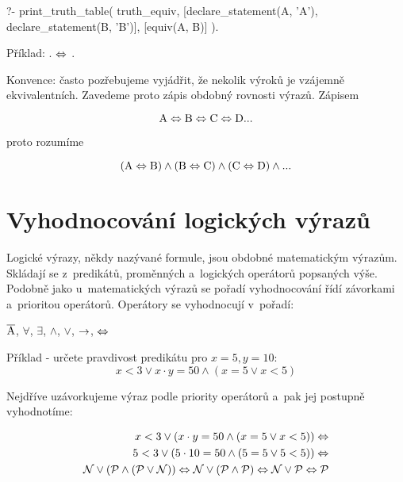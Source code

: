\begin{prolog}
?- print_truth_table(
	truth_equiv,
	[declare_statement(A, 'A'), declare_statement(B, 'B')],
	[equiv(A, B)]
).
\end{prolog}

Příklad: .  \(\Leftrightarrow\) .

Konvence: často pozřebujeme vyjádřit, že nekolik výroků je vzájemně ekvivalentních. Zavedeme proto zápis obdobný rovnosti výrazů. Zápisem

\begin{equation}
\mathrm{A} \Leftrightarrow \mathrm{B} \Leftrightarrow \mathrm{C} \Leftrightarrow \mathrm{D} ... 
\end{equation}

proto rozumíme

\begin{equation}
(\mathrm{A} \Leftrightarrow \mathrm{B}) \land (\mathrm{B} \Leftrightarrow \mathrm{C}) \land (\mathrm{C} \Leftrightarrow \mathrm{D}) \land ... 
\end{equation}

\section{Vyhodnocování logických výrazů}

Logické výrazy, někdy nazývané formule, jsou obdobné matematickým výrazům. Skládají se z~predikátů, proměnných a~logických operátorů popsaných výše. Podobně jako u~matematických výrazů se pořadí vyhodnocování řídí závorkami a~prioritou operátorů. Operátory se vyhodnocují v~pořadí:

\(\overline{\mathrm{A}}\), \(\forall\), \(\exists\), \(\land\), \(\lor\), \(\rightarrow\), \(\Leftrightarrow\)

Příklad - určete pravdivost predikátu pro \(x = 5, y = 10\):
\begin{equation}
x < 3 \lor x \cdot y = 50 \land (x = 5 \lor x < 5)
\end{equation}

Nejdříve uzávorkujeme výraz podle priority operátorů a~pak jej postupně vyhodnotíme:

\begin{equation}
\begin{split}
x < 3 \lor (x \cdot y = 50 \land (x = 5 \lor x < 5)) \Leftrightarrow \\
5 < 3 \lor (5 \cdot 10 = 50 \land (5 = 5 \lor 5 < 5)) \Leftrightarrow \\
\mathcal{N} \lor (\mathcal{P} \land (\mathcal{P} \lor \mathcal{N})) \Leftrightarrow \mathcal{N} \lor (\mathcal{P} \land \mathcal{P}) \Leftrightarrow \mathcal{N} \lor \mathcal{P} \Leftrightarrow \mathcal{P} 
\end{split}
\end{equation}

